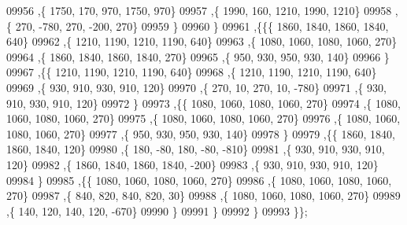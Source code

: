 \begin{DoxyCode}
09956     ,\{  1750,   170,   970,  1750,   970\}
09957     ,\{  1990,   160,  1210,  1990,  1210\}
09958     ,\{   270,  -780,   270,  -200,   270\}
09959     \}
09960    \}
09961   ,\{\{\{  1860,  1840,  1860,  1840,   640\}
09962     ,\{  1210,  1190,  1210,  1190,   640\}
09963     ,\{  1080,  1060,  1080,  1060,   270\}
09964     ,\{  1860,  1840,  1860,  1840,   270\}
09965     ,\{   950,   930,   950,   930,   140\}
09966     \}
09967    ,\{\{  1210,  1190,  1210,  1190,   640\}
09968     ,\{  1210,  1190,  1210,  1190,   640\}
09969     ,\{   930,   910,   930,   910,   120\}
09970     ,\{   270,    10,   270,    10,  -780\}
09971     ,\{   930,   910,   930,   910,   120\}
09972     \}
09973    ,\{\{  1080,  1060,  1080,  1060,   270\}
09974     ,\{  1080,  1060,  1080,  1060,   270\}
09975     ,\{  1080,  1060,  1080,  1060,   270\}
09976     ,\{  1080,  1060,  1080,  1060,   270\}
09977     ,\{   950,   930,   950,   930,   140\}
09978     \}
09979    ,\{\{  1860,  1840,  1860,  1840,   120\}
09980     ,\{   180,   -80,   180,   -80,  -810\}
09981     ,\{   930,   910,   930,   910,   120\}
09982     ,\{  1860,  1840,  1860,  1840,  -200\}
09983     ,\{   930,   910,   930,   910,   120\}
09984     \}
09985    ,\{\{  1080,  1060,  1080,  1060,   270\}
09986     ,\{  1080,  1060,  1080,  1060,   270\}
09987     ,\{   840,   820,   840,   820,    30\}
09988     ,\{  1080,  1060,  1080,  1060,   270\}
09989     ,\{   140,   120,   140,   120,  -670\}
09990     \}
09991    \}
09992   \}
09993  \}\};
\end{DoxyCode}
